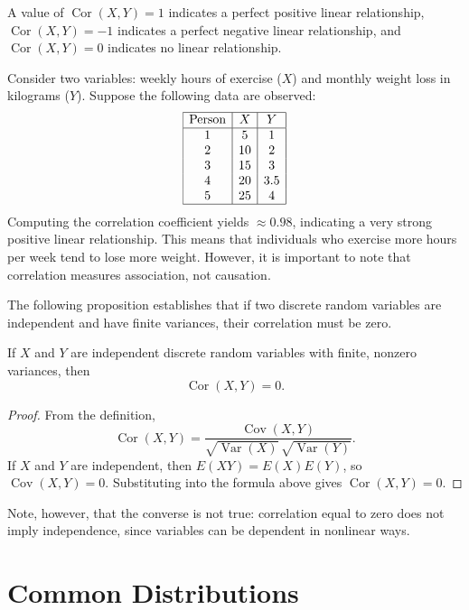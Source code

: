 A value of $\operatorname{Cor}(X,Y) = 1$ indicates a perfect positive linear relationship, $\operatorname{Cor}(X,Y) = -1$ indicates a perfect negative linear relationship, and $\operatorname{Cor}(X,Y) = 0$ indicates no linear relationship.

\begin{example}
Consider two variables: weekly hours of exercise ($X$) and monthly weight loss in kilograms ($Y$). Suppose the following data are observed:
\[
\begin{array}{|c|c|c|}
\hline
\text{Person} & X & Y \\
\hline
1 & 5 & 1 \\
2 & 10 & 2 \\
3 & 15 & 3 \\
4 & 20 & 3.5 \\
5 & 25 & 4 \\
\hline
\end{array}
\]
Computing the correlation coefficient yields $\approx 0.98$, indicating a very strong positive linear relationship. This means that individuals who exercise more hours per week tend to lose more weight. However, it is important to note that correlation measures association, not causation.
\end{example}

The following proposition establishes that if two discrete random variables are independent and have finite variances, their correlation must be zero.

\begin{proposition}
If $X$ and $Y$ are independent discrete random variables with finite, nonzero variances, then
\[
\operatorname{Cor}(X,Y) = 0.
\]
\end{proposition}
\begin{proof}
From the definition,
\[
\operatorname{Cor}(X,Y) = \frac{\operatorname{Cov}(X,Y)}{\sqrt{\operatorname{Var}(X)} \, \sqrt{\operatorname{Var}(Y)}}.
\]
If $X$ and $Y$ are independent, then $E(XY) = E(X)E(Y)$, so $\operatorname{Cov}(X,Y) = 0$. Substituting into the formula above gives $\operatorname{Cor}(X,Y) = 0$.
\end{proof}

Note, however, that the converse is not true: correlation equal to zero does not imply independence, since variables can be dependent in nonlinear ways.

%
%

\section{Common Distributions}
\label{sec:probability_distributions}

